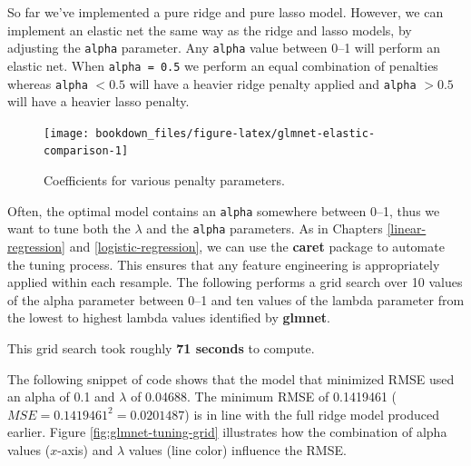 \documentclass[]{krantz}
\makeatletter
\newenvironment{kframe}{%
\medskip{}
\setlength{\fboxsep}{.8em}
 \def\at@end@of@kframe{}%
 \ifinner\ifhmode%
  \def\at@end@of@kframe{\end{minipage}}%
  \begin{minipage}{\columnwidth}%
 \fi\fi%
 \def\FrameCommand##1{\hskip\@totalleftmargin \hskip-\fboxsep
 \colorbox{shadecolor}{##1}\hskip-\fboxsep
     \hskip-\linewidth \hskip-\@totalleftmargin \hskip\columnwidth}%
 \MakeFramed {\advance\hsize-\width
   \@totalleftmargin\z@ \linewidth\hsize
   \@setminipage}}%
 {\par\unskip\endMakeFramed%
 \at@end@of@kframe}
\newenvironment{block}[1]
  {
  \begin{itemize}
  \renewcommand{\labelitemi}{
    \raisebox{-.7\height}[0pt][0pt]{
      {\setkeys{Gin}{width=3em,keepaspectratio}\texttt{[image: icons/\#1]}}
    }
  }
  \setlength{\fboxsep}{1em}
  \begin{kframe}
  \item
  }
  {
  \end{kframe}
  \end{itemize}
  }
\newenvironment{warning}
  {\begin{block}{warning}}
  {\end{block}}
\makeatother
\begin{document}
So far we've implemented a pure ridge and pure lasso model. However, we can implement an elastic net the same way as the ridge and lasso models, by adjusting the \texttt{alpha} parameter. Any \texttt{alpha} value between 0--1 will perform an elastic net. When \texttt{alpha\ =\ 0.5} we perform an equal combination of penalties whereas \texttt{alpha} \(< 0.5\) will have a heavier ridge penalty applied and \texttt{alpha} \(> 0.5\) will have a heavier lasso penalty.

\begin{figure}

{\centering \texttt{[image: bookdown\_files/figure-latex/glmnet-elastic-comparison-1]} 

}

\caption{Coefficients for various penalty parameters.}\label{fig:glmnet-elastic-comparison}
\end{figure}

Often, the optimal model contains an \texttt{alpha} somewhere between 0--1, thus we want to tune both the \(\lambda\) and the \texttt{alpha} parameters. As in Chapters \ref{linear-regression} and \ref{logistic-regression}, we can use the \textbf{caret} package to automate the tuning process. This ensures that any feature engineering is appropriately applied within each resample. The following performs a grid search over 10 values of the alpha parameter between 0--1 and ten values of the lambda parameter from the lowest to highest lambda values identified by \textbf{glmnet}.

\begin{warning}
This grid search took roughly \textbf{71 seconds} to compute.
\end{warning}

The following snippet of code shows that the model that minimized RMSE used an alpha of 0.1 and \(\lambda\) of 0.04688. The minimum RMSE of 0.1419461 (\(MSE = 0.1419461^2 = 0.0201487\)) is in line with the full ridge model produced earlier. Figure \ref{fig:glmnet-tuning-grid} illustrates how the combination of alpha values (\(x\)-axis) and \(\lambda\) values (line color) influence the RMSE.
\end{document}
